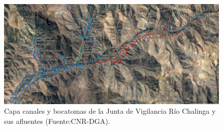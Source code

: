 \documentclass[]{article}
\begin{document}
\begin{figure} [H]
	\includegraphics{SIG/canales.jpg}
	\caption{Capa canales y bocatomas de la Junta de Vigilancia Río Chalinga y sus afluentes (Fuente:CNR-DGA).}
	\label{canales}
\end{figure}
\end{document}
